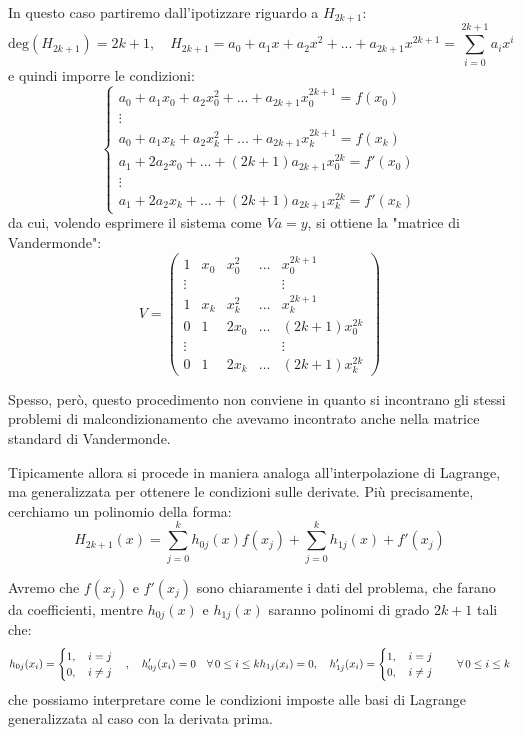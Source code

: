 \documentclass[a4paper,11pt]{article}
\begin{document}
In questo caso partiremo dall'ipotizzare riguardo a $H_{2k + 1}$:
$$
\mathrm{deg}(H_{2k + 1}) = 2k + 1, \quad H_{2k + 1} = a_0 + a_1 x + a_2 x^2 + ... + a_{2k + 1} x^{2k + 1} = \sum_{i = 0}^{2k + 1} a_i x^i
$$
e quindi imporre le condizioni:
\[
	\begin{cases}
		a_0 + a_1 x_0 + a_2 x_0^2 + ... + a_{2k + 1} x_0^{2k + 1} = f(x_0) \\	
		\vdots \\
		a_0 + a_1 x_k + a_2 x_k^2 + ... + a_{2k + 1} x_k^{2k + 1} = f(x_k) \\
		a_1 + 2 a_2 x_0 + ... + (2k + 1) a_{2k + 1} x_0^{2k} = f'(x_0) \\
		\vdots \\
		a_1 + 2 a_2 x_k + ... + (2k + 1) a_{2k + 1} x_k^{2k} = f'(x_k)
	\end{cases}
\]
da cui, volendo esprimere il sistema come $Va = y$, si ottiene la "matrice di Vandermonde":
$$
V = 
\begin{pmatrix}
	1 & x_0 & x_0^2 & ... & x_0^{2k + 1} \\	
	\vdots  & & & & \vdots \\
	1 & x_k & x_k^2 & ... & x_k^{2k + 1} \\
	0 & 1 & 2 x_0 & ... & (2k + 1) x_0^{2k} \\
	\vdots  & & & & \vdots \\
	0 & 1 & 2 x_k & ... & (2k + 1) x_k^{2k} 
\end{pmatrix}
$$

Spesso, però, questo procedimento non conviene in quanto si incontrano gli stessi problemi di malcondizionamento che avevamo incontrato anche nella matrice standard di Vandermonde.

\par\smallskip

Tipicamente allora si procede in maniera analoga all'interpolazione di Lagrange, ma generalizzata per ottenere le condizioni sulle derivate.
Più precisamente, cerchiamo un polinomio della forma:
$$
H_{2k + 1}(x) = \sum_{j = 0}^k h_{0j}(x) f(x_j) + \sum_{j = 0}^k h_{1j}(x) + f'(x_j)
$$

Avremo che $f(x_j)$ e $f'(x_j)$ sono chiaramente i dati del problema, che farano da coefficienti, mentre $h_{0j}(x)$ e $h_{1j}(x)$ saranno polinomi di grado $2k + 1$ tali che:
\begin{equation}
h_{0j}(x_i) =
\begin{cases}
	1, \quad i = j \\
	0, \quad i \neq j
\end{cases}, \quad
h'_{0j}(x_i) = 0  \quad \forall \, 0 \leq i \leq k
$$
$$
h_{1j}(x_i) = 0, \quad
h'_{1j}(x_i) =
\begin{cases}
	1, \quad i = j \\
	0, \quad i \neq j
\end{cases} \quad \forall \, 0 \leq i \leq k
\end{equation}
che possiamo interpretare come le condizioni imposte alle basi di Lagrange generalizzata al caso con la derivata prima.
\end{document}
